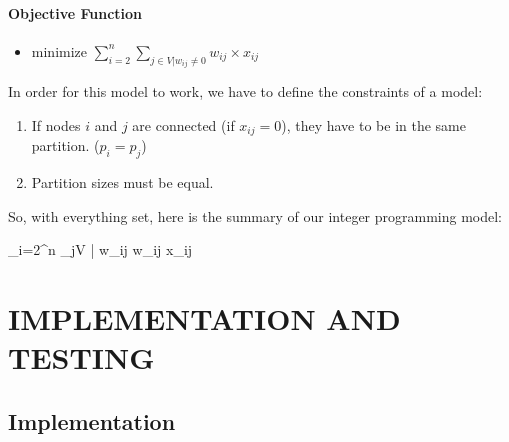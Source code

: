 \documentclass[a4paper,12pt]{report}
\begin{document}
\subsubsection{Objective Function}
\begin{itemize}
	\item minimize \( \displaystyle\sum_{i=2}^{n} \displaystyle\sum_{j\in V | w_{ij} \neq 0} w_{ij} \times x_{ij} \)
\end{itemize}

In order for this model to work, we have to define the constraints of a model:

\begin{enumerate}
	\item If nodes \( i \) and \( j \) are connected (if \(x_{ij} = 0\)), they have to be in the same partition. (\( p_i = p_j \))
	\item Partition sizes must be equal.
\end{enumerate}

So, with everything set, here is the summary of our integer programming model:

\begin{mini*}[1]
	{}{\sum_{i=2}^{n} \sum_{j\in V | w_{ij} } w_{ij} \times x_{ij}}
{\label{eq:IPmodel}}{}
\end{mini*}


\chapter{IMPLEMENTATION AND TESTING}

\section{Implementation}
\end{document}
